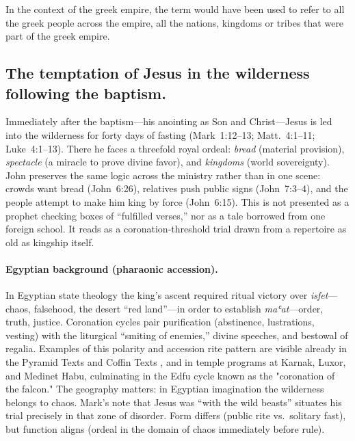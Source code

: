 In the context of the greek empire, the term would have been used to refer to all the greek people across the empire, all the nations, kingdoms or tribes that were part of the greek empire.

\subsection{The temptation of Jesus in the wilderness following the baptism.}\label{subsec:the-temptation-of-jesus-in-the-wilderness-following-the-baptism.}

Immediately after the baptism---his anointing as Son and Christ---Jesus is led into the wilderness for forty days of fasting (Mark~1:12--13; Matt.~4:1--11; Luke~4:1--13).
There he faces a threefold royal ordeal: \emph{bread} (material provision), \emph{spectacle} (a miracle to prove divine favor), and \emph{kingdoms} (world sovereignty).
John preserves the same logic across the ministry rather than in one scene: crowds want bread (John~6:26), relatives push public signs (John~7:3--4), and the people attempt to make him king by force (John~6:15).
This is not presented as a prophet checking boxes of “fulfilled verses,” nor as a tale borrowed from one foreign school.
It reads as a coronation‐threshold trial drawn from a repertoire as old as kingship itself.

\paragraph*{Egyptian background (pharaonic accession).}
In Egyptian state theology the king’s ascent required ritual victory over \emph{isfet}---chaos, falsehood, the desert “red land”---in order to establish \emph{maʿat}---order, truth, justice.
Coronation cycles pair purification (abstinence, lustrations, vesting) with the liturgical “smiting of enemies,” divine speeches, and bestowal of regalia.
Examples of this polarity and accession rite pattern are visible already in the Pyramid Texts \cite{pyramidtexts} and Coffin Texts \cite{coffintexts}, and in temple programs at Karnak, Luxor, and Medinet Habu, culminating in the Edfu cycle known as the "coronation of the falcon."
The geography matters: in Egyptian imagination the wilderness belongs to chaos.
Mark’s note that Jesus was “with the wild beasts” situates his trial precisely in that zone of disorder.
Form differs (public rite vs.\ solitary fast), but function aligns (ordeal in the domain of chaos immediately before rule).


